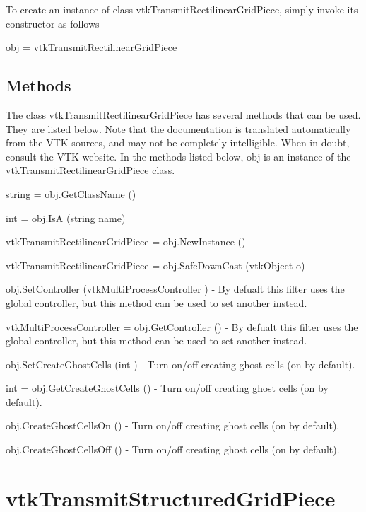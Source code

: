 To create an instance of class vtk\-Transmit\-Rectilinear\-Grid\-Piece, simply invoke its constructor as follows \begin{DoxyVerb}  obj = vtkTransmitRectilinearGridPiece
\end{DoxyVerb}
 \hypertarget{vtkwidgets_vtkxyplotwidget_Methods}{}\subsection{Methods}\label{vtkwidgets_vtkxyplotwidget_Methods}
The class vtk\-Transmit\-Rectilinear\-Grid\-Piece has several methods that can be used. They are listed below. Note that the documentation is translated automatically from the V\-T\-K sources, and may not be completely intelligible. When in doubt, consult the V\-T\-K website. In the methods listed below, {\ttfamily obj} is an instance of the vtk\-Transmit\-Rectilinear\-Grid\-Piece class. 
\begin{DoxyItemize}
\item {\ttfamily string = obj.\-Get\-Class\-Name ()}  
\item {\ttfamily int = obj.\-Is\-A (string name)}  
\item {\ttfamily vtk\-Transmit\-Rectilinear\-Grid\-Piece = obj.\-New\-Instance ()}  
\item {\ttfamily vtk\-Transmit\-Rectilinear\-Grid\-Piece = obj.\-Safe\-Down\-Cast (vtk\-Object o)}  
\item {\ttfamily obj.\-Set\-Controller (vtk\-Multi\-Process\-Controller )} -\/ By defualt this filter uses the global controller, but this method can be used to set another instead.  
\item {\ttfamily vtk\-Multi\-Process\-Controller = obj.\-Get\-Controller ()} -\/ By defualt this filter uses the global controller, but this method can be used to set another instead.  
\item {\ttfamily obj.\-Set\-Create\-Ghost\-Cells (int )} -\/ Turn on/off creating ghost cells (on by default).  
\item {\ttfamily int = obj.\-Get\-Create\-Ghost\-Cells ()} -\/ Turn on/off creating ghost cells (on by default).  
\item {\ttfamily obj.\-Create\-Ghost\-Cells\-On ()} -\/ Turn on/off creating ghost cells (on by default).  
\item {\ttfamily obj.\-Create\-Ghost\-Cells\-Off ()} -\/ Turn on/off creating ghost cells (on by default).  
\end{DoxyItemize}\hypertarget{vtkparallel_vtktransmitstructuredgridpiece}{}\section{vtk\-Transmit\-Structured\-Grid\-Piece}\label{vtkparallel_vtktransmitstructuredgridpiece}
